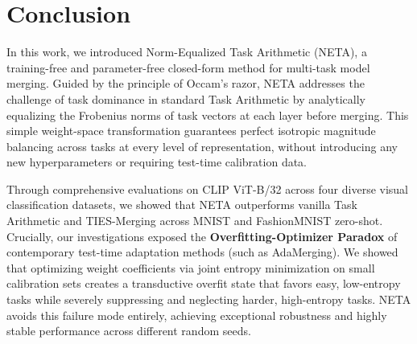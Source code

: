 \section{Conclusion}
\label{sec:conclusion}

In this work, we introduced Norm-Equalized Task Arithmetic (NETA), a training-free and parameter-free closed-form method for multi-task model merging. Guided by the principle of Occam's razor, NETA addresses the challenge of task dominance in standard Task Arithmetic by analytically equalizing the Frobenius norms of task vectors at each layer before merging. This simple weight-space transformation guarantees perfect isotropic magnitude balancing across tasks at every level of representation, without introducing any new hyperparameters or requiring test-time calibration data.

Through comprehensive evaluations on CLIP ViT-B/32 across four diverse visual classification datasets, we showed that NETA outperforms vanilla Task Arithmetic and TIES-Merging across MNIST and FashionMNIST zero-shot. Crucially, our investigations exposed the \textbf{Overfitting-Optimizer Paradox} of contemporary test-time adaptation methods (such as AdaMerging). We showed that optimizing weight coefficients via joint entropy minimization on small calibration sets creates a transductive overfit state that favors easy, low-entropy tasks while severely suppressing and neglecting harder, high-entropy tasks. NETA avoids this failure mode entirely, achieving exceptional robustness and highly stable performance across different random seeds.

